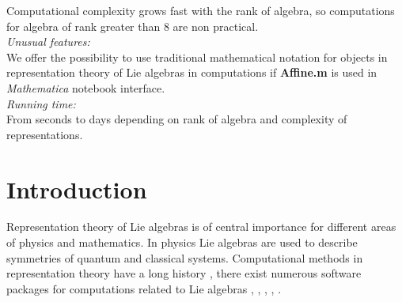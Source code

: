 \begin{small}
Computational complexity grows fast  with the rank of algebra, so computations for algebra of rank greater than 8 are non practical.
   \\
{\em Unusual features:}\\
We offer the possibility to use traditional mathematical notation for objects in representation theory of Lie algebras in computations if {\bf Affine.m} is used in {\it Mathematica} notebook interface.
   \\
{\em Running time:}\\
From seconds to days depending on rank of algebra and complexity of representations.
   \\

\end{small}


\section{Introduction}
\label{intro}

Representation theory of Lie algebras is of central importance for different areas of physics and mathematics. In physics Lie algebras are used to describe symmetries of quantum and classical systems. Computational methods in representation theory have a long history \cite{belinfante1989survey}, there exist numerous software packages for computations related to Lie algebras \cite{simplie}, \cite{vanleeuwen1994lsp}, \cite{stembridge1995mps,coxweyl}, \cite{fischbacher2002ilp}, \cite{Fuchs:1996dd}.

